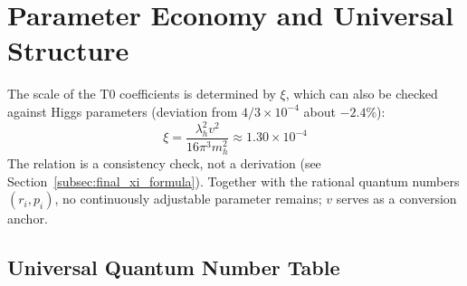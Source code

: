 	\section{Parameter Economy and Universal Structure}
	\label{sec:parameter_free_nature}
	
	\begin{important}
		The scale of the T0 coefficients is determined by $\xi$, which can also be checked against Higgs parameters (deviation from $4/3 \times 10^{-4}$ about $-2.4$\%):
		\begin{equation}
			\xi = \frac{\lambda_h^2 v^2}{16\pi^3 m_h^2} \approx 1.30 \times 10^{-4}
		\end{equation}
		The relation is a consistency check, not a derivation (see Section~\ref{subsec:final_xi_formula}).
		Together with the rational quantum numbers $(r_i, p_i)$, no continuously adjustable parameter remains; $v$ serves as a conversion anchor.
	\end{important}
	
	\subsection{Universal Quantum Number Table}
	\label{subsec:universal_quantum_table}
	
	\begin{table}[H]
		\centering
		\caption{Universal quantum number table for all fermions}
		\label{tab:universal_quantum_numbers}
	\end{table}
	
